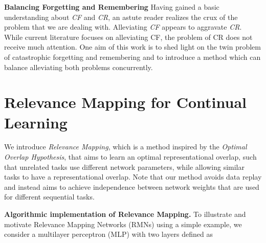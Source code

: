 \documentclass{article}
\begin{document}
\textbf{Balancing Forgetting and Remembering}
Having gained a basic understanding about \textit{CF} and \textit{CR}, an astute reader realizes the crux of the problem that we are dealing with. 
Alleviating \textit{CF} appears to aggravate \textit{CR}.
While current literature focuses on alleviating CF, the problem of CR does not receive much attention. 
One aim of this work is to shed light on the twin problem of catastrophic forgetting and remembering and to introduce a 
method which can balance alleviating both problems concurrently. 

\section{Relevance Mapping for Continual Learning}\label{amm}
We introduce \textit{Relevance Mapping}, which is a method inspired by the \textit{Optimal Overlap Hypothesis}, that aims to learn an optimal representational overlap, such that unrelated tasks use different network parameters, while allowing similar tasks to have a representational overlap. 
Note that our method avoids data replay and instead aims to achieve independence between network weights that are used for different sequential tasks.

\textbf{Algorithmic implementation of Relevance Mapping.}
To illustrate and motivate Relevance Mapping Networks (RMNs) using a simple example, we consider a multilayer perceptron (MLP) with two layers  
defined as 
\end{document}
